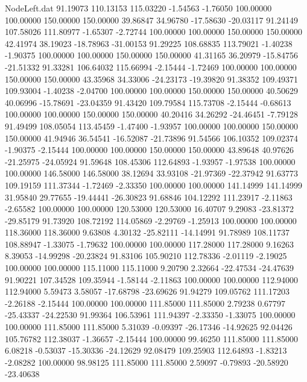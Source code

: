 \begin{filecontents}{NodeLeft.dat}
  91.19073  110.13153  115.03220    -1.54563   -1.76050  100.00000  100.00000  150.00000  150.00000   39.86847   34.96780  -17.58630  -20.03117
  91.24149  107.58026  111.80977    -1.65307   -2.72744  100.00000  100.00000  150.00000  150.00000   42.41974   38.19023  -18.78963  -31.00153
  91.29225  108.68835  113.79021    -1.40238   -1.90375  100.00000  100.00000  150.00000  150.00000   41.31165   36.20979  -15.84756  -21.51332
  91.33281  106.64032  115.66994    -2.15444   -1.72469  100.00000  100.00000  150.00000  150.00000   43.35968   34.33006  -24.23173  -19.39820
  91.38352  109.49371  109.93004    -1.40238   -2.04700  100.00000  100.00000  150.00000  150.00000   40.50629   40.06996  -15.78691  -23.04359
  91.43420  109.79584  115.73708    -2.15444   -0.68613  100.00000  100.00000  150.00000  150.00000   40.20416   34.26292  -24.46451   -7.79128
  91.49499  108.05054  113.45459    -1.47400   -1.93957  100.00000  100.00000  150.00000  150.00000   41.94946   36.54541  -16.52087  -21.73896
  91.54566  106.10352  109.02374    -1.90375   -2.15444  100.00000  100.00000  150.00000  150.00000   43.89648   40.97626  -21.25975  -24.05924
  91.59648  108.45306  112.64893    -1.93957   -1.97538  100.00000  100.00000  146.58000  146.58000   38.12694   33.93108  -21.97369  -22.37942
  91.63773  109.19159  111.37344    -1.72469   -2.33350  100.00000  100.00000  141.14999  141.14999   31.95840   29.77655  -19.44441  -26.30823
  91.68846  104.12292  111.23917    -2.11863   -2.65582  100.00000  100.00000  120.53000  120.53000   16.40707    9.29083  -23.81372  -29.85179
  91.73920  108.72192  114.05869    -2.29769   -1.25913  100.00000  100.00000  118.36000  118.36000    9.63808    4.30132  -25.82111  -14.14991
  91.78989  108.11737  108.88947    -1.33075   -1.79632  100.00000  100.00000  117.28000  117.28000    9.16263    8.39053  -14.99298  -20.23824
  91.83106  105.90210  112.78336    -2.01119   -2.19025  100.00000  100.00000  115.11000  115.11000    9.20790    2.32664  -22.47534  -24.47639
  91.90221  107.34528  109.35944    -1.58144   -2.11863  100.00000  100.00000  112.94000  112.94000    5.59473    3.58057  -17.68798  -23.69626
  91.94279  109.05762  111.17203    -2.26188   -2.15444  100.00000  100.00000  111.85000  111.85000    2.79238    0.67797  -25.43337  -24.22530
  91.99364  106.53961  111.94397    -2.33350   -1.33075  100.00000  100.00000  111.85000  111.85000    5.31039   -0.09397  -26.17346  -14.92625
  92.04426  105.76782  112.38037    -1.36657   -2.15444  100.00000   99.46250  111.85000  111.85000    6.08218   -0.53037  -15.30336  -24.12629
  92.08479  109.25903  112.64893    -1.83213   -2.08282  100.00000   98.98125  111.85000  111.85000    2.59097   -0.79893  -20.58920  -23.40638

\end{filecontents}
